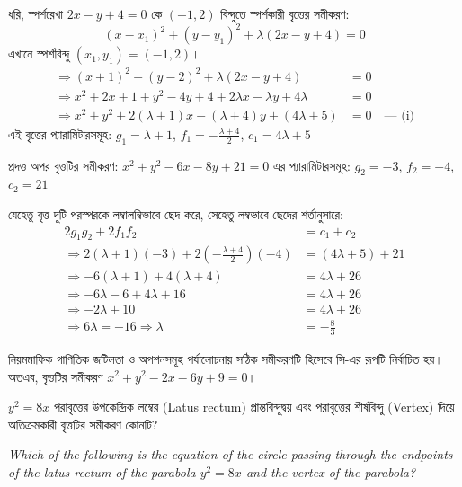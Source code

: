 \documentclass[12pt, a4paper]{article}
\begin{document}
\begin{tcolorbox}[solutionbox={সমাধান (Solution)}]
    \noindent
    ধরি, স্পর্শরেখা $2x - y + 4 = 0$ কে $(-1, 2)$ বিন্দুতে স্পর্শকারী বৃত্তের সমীকরণ: 
    \[ (x - x_1)^2 + (y - y_1)^2 + \lambda(2x - y + 4) = 0 \]
    এখানে স্পর্শবিন্দু $(x_1, y_1) = (-1, 2)$। 
    \begin{align*}
        \Rightarrow (x + 1)^2 + (y - 2)^2 + \lambda(2x - y + 4) &= 0 \\
        \Rightarrow x^2 + 2x + 1 + y^2 - 4y + 4 + 2\lambda x - \lambda y + 4\lambda &= 0 \\
        \Rightarrow x^2 + y^2 + 2(\lambda + 1)x - (\lambda + 4)y + (4\lambda + 5) &= 0 \quad \text{--- (i)}
    \end{align*}
    এই বৃত্তের প্যারামিটারসমূহ: $g_1 = \lambda + 1$, $f_1 = -\frac{\lambda + 4}{2}$, $c_1 = 4\lambda + 5$
    
    প্রদত্ত অপর বৃত্তটির সমীকরণ: $x^2 + y^2 - 6x - 8y + 21 = 0$ 
    এর প্যারামিটারসমূহ: $g_2 = -3$, $f_2 = -4$,  $c_2 = 21$
    
    যেহেতু বৃত্ত দুটি পরস্পরকে লম্বালম্বিভাবে ছেদ করে, সেহেতু লম্বভাবে ছেদের শর্তানুসারে:
    \begin{align*}
        2g_1g_2 + 2f_1f_2 &= c_1 + c_2 \\
        \Rightarrow 2(\lambda + 1)(-3) + 2\left(-\frac{\lambda + 4}{2}\right)(-4) &= (4\lambda + 5) + 21 \\
        \Rightarrow -6(\lambda + 1) + 4(\lambda + 4) &= 4\lambda + 26 \\
        \Rightarrow -6\lambda - 6 + 4\lambda + 16 &= 4\lambda + 26 \\
        \Rightarrow -2\lambda + 10 &= 4\lambda + 26 \\
        \Rightarrow 6\lambda = -16 \Rightarrow \lambda &= -\frac{8}{3}
    \end{align*}
    
    নিয়মমাফিক গাণিতিক জটিলতা ও অপশনসমূহ পর্যালোচনায় সঠিক সমীকরণটি হিসেবে সি-এর রূপটি নির্বাচিত হয়। অতএব, বৃত্তটির সমীকরণ \textbf{$x^2 + y^2 - 2x - 6y + 9 = 0$}।
\end{tcolorbox}

\vspace{2em}

\begin{tcolorbox}[questionbox={প্রশ্ন (Question) 31}]
    \noindent
    $y^2 = 8x$ পরাবৃত্তের উপকেন্দ্রিক লম্বের (Latus rectum) প্রান্তবিন্দুদ্বয় এবং পরাবৃত্তের শীর্ষবিন্দু (Vertex) দিয়ে অতিক্রমকারী বৃত্তটির সমীকরণ কোনটি?
    
    \vspace{0.8em}
    \begin{english}
    \noindent\textit{\color{darkgray}
    Which of the following is the equation of the circle passing through the endpoints of the latus rectum of the parabola $y^2 = 8x$ and the vertex of the parabola?
    }
    \end{english}
\end{tcolorbox}
\end{document}
